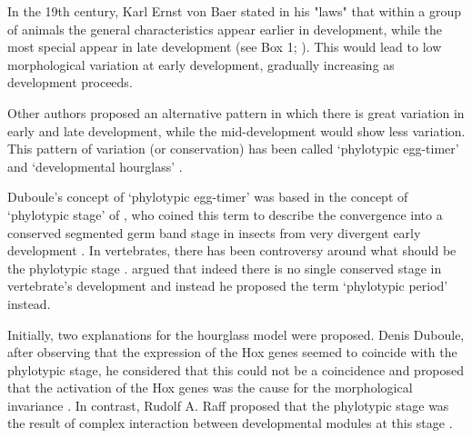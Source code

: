
%
%
%

\label{hourglass}

In the 19th century, Karl Ernst von Baer stated in his "laws" that within a group of animals the general characteristics appear earlier in development, while the most special appear in late development (see Box 1; \citealp{vonBaer1828uber}).
This would lead to low morphological variation at early development, gradually increasing as development proceeds.

Other authors \citep{Medawar1954,Slack1993,Duboule1994,Raff1996} proposed an alternative pattern in which there is great variation in early and late development, while the mid-development would show less variation.
This pattern of variation (or conservation) has been called `phylotypic egg-timer' \citep{Duboule1994} and `developmental hourglass' \citep{Raff1996}.

Duboule's concept of `phylotypic egg-timer' was based in the concept of `phylotypic stage' of \citet{Sander1983}, who coined this term to describe the convergence into a conserved segmented germ band stage in insects from very divergent early development \citep{Sander1996}.
In vertebrates, there has been controversy around what should be the phylotypic stage \citep{Ballard1981,Slack1993,Duboule1994}. \citet{Richardson1995} argued that indeed there is no single conserved stage in vertebrate's development and instead he proposed the term `phylotypic period' instead.

Initially, two explanations for the hourglass model were proposed.
Denis Duboule, after observing that the expression of the Hox genes seemed to coincide with the phylotypic stage, he considered that this could not be a coincidence and proposed that the activation of the Hox genes was the cause for the morphological invariance \citep{Duboule1994}.
In contrast, Rudolf A. Raff proposed that the phylotypic stage was the result of complex interaction between developmental modules at this stage  \citep{Raff1996}.

